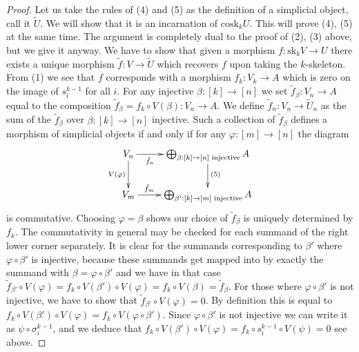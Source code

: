 \begin{proof}
\medskip\noindent
Let us take the rules of (4) and (5)
as the definition of a simplicial object, call it $\tilde U$.
We will show that it is an incarnation of $\text{cosk}_k U$.
This will prove (4), (5) at the same time. The argument is completely dual
to the proof of (2), (3) above, but we give it anyway.
We have to show
that given a morphism $f : \text{sk}_kV \to U$
there exists a unique morphism $\tilde f : V \to \tilde U$
which recovers $f$ upon taking the $k$-skeleton.
From (1) we see that $f$ corresponds with a morphism
$f_k : V_k \to A$ which is zero on the image of $s^{k - 1}_i$
for all $i$. For any injective $\beta : [k] \to [n]$
we set $\tilde f_\beta : V_n \to A$ equal to the composition
$\tilde f_\beta = f_k \circ V(\beta) : V_n \to A$. We define
$\tilde f_n : V_n \to \tilde U_n$ as the sum of
the $\tilde f_\beta$ over $\beta : [k] \to [n]$ injective.
Such a collection of $\tilde f_\beta$ defines a morphism
of simplicial objects if and only if
for any $\varphi : [m] \to [n]$ the diagram
$$
\xymatrix{
V_n
\ar[d]_{V(\varphi)}
\ar[r]_-{\tilde f_n}
&
\bigoplus_{\beta : [k] \to [n]\text{ injective}} A
\ar[d]^{(5)}
\\
V_m
\ar[r]^-{\tilde f_m}
& 
\bigoplus_{\beta' : [k] \to [m]\text{ injective}} A
}
$$
is commutative. Choosing $\varphi = \beta$ shows our choice of
$\tilde f_\beta$ is uniquely determined by $f_k$.
The commutativity in general may be checked for each summand
of the right lower corner separately. It is clear for the
summands corresponding to $\beta'$ where
$\varphi \circ \beta'$ is injective, because these summands
get mapped into by exactly the summand with
$\beta = \varphi \circ \beta'$ and we have in that case
$\tilde f_{\beta'} \circ V(\varphi) =
f_k \circ V(\beta') \circ V(\varphi) =
f_k \circ V(\beta) = \tilde f_\beta$. For those where
$\varphi \circ \beta'$ is not injective,
we have to show that $\tilde f_{\beta'} \circ V(\varphi) = 0$.
By definition this is equal to
$f_k \circ V(\beta') \circ V(\varphi) =
f_k \circ V(\varphi \circ \beta')$.
Since $\varphi \circ \beta'$ is not injective we can write it
as $\psi \circ \sigma^{k - 1}_i$, and we deduce that
$f_k \circ V(\beta') \circ V(\varphi) =
f_k \circ s^{k - 1}_i \circ V(\psi) = 0$ see above.


\end{proof}
